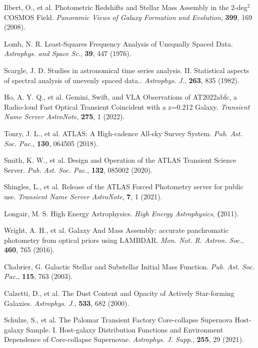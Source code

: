 \documentclass{nature_plusfigure}
\newcommand{\mn}{{Mon. Not. R. Astron. Soc.}}
\newcommand{\mnras}{\mn}
\newcommand{\apj}{{Astrophys. J.}}
\newcommand{\apjs}{{Astrophys. J. Supp.}}
\newcommand{\apss}{{Astrophys. and Space Sc.}}
\newcommand{\pasp}{{Pub. Ast. Soc. Pac.}}
\begin{document}
\begin{methods}
\begin{thebibliography}{10}
 Ilbert, O., et al. Photometric Redshifts and Stellar Mass Assembly in the 2-deg$^2$ COSMOS Field. \emph{Panoramic Views of Galaxy Formation and Evolution}, \textbf{399}, 169 (2008). 


 Lomb, N. R. Least-Squares Frequency Analysis of Unequally Spaced Data. \emph{\apss}, \textbf{39}, 447 (1976). 

 Scargle, J. D. Studies in astronomical time series analysis. II. Statistical aspects of spectral analysis of unevenly spaced data.. \emph{\apj}, \textbf{263}, 835 (1982). 


 Ho, A. Y. Q., et al. Gemini, Swift, and VLA Observations of AT2022abfc, a Radio-loud Fast Optical Transient Coincident with a z=0.212 Galaxy. \emph{Transient Name Server AstroNote}, \textbf{275}, 1 (2022). 

  Tonry, J. L., et al. ATLAS: A High-cadence All-sky Survey System. \emph{\pasp}, \textbf{130}, 064505 (2018). 

 Smith, K. W., et al. Design and Operation of the ATLAS Transient Science Server. \emph{\pasp}, \textbf{132}, 085002 (2020). 

 Shingles, L., et al. Release of the ATLAS Forced Photometry server for public use. \emph{Transient Name Server AstroNote}, \textbf{7}, 1 (2021). 

  Longair, M. S. High Energy Astrophysics. \emph{High Energy Astrophysics}, \textbf (2011). 
 
 
  Wright, A. H., et al. Galaxy And Mass Assembly: accurate panchromatic photometry from optical priors using LAMBDAR. \emph{\mnras}, \textbf{460}, 765 (2016). 
 
   Chabrier, G. Galactic Stellar and Substellar Initial Mass Function. \emph{\pasp}, \textbf{115}, 763 (2003). 

 Calzetti, D., et al. The Dust Content and Opacity of Actively Star-forming Galaxies. \emph{\apj}, \textbf{533}, 682 (2000). 

 Schulze, S., et al. The Palomar Transient Factory Core-collapse Supernova Host-galaxy Sample. I. Host-galaxy Distribution Functions and Environment Dependence of Core-collapse Supernovae. \emph{\apjs}, \textbf{255}, 29 (2021). 


\end{thebibliography}
\end{methods}
\end{document}
